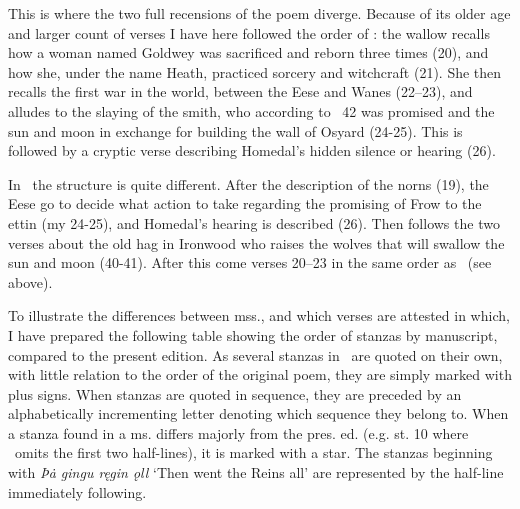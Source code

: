 This is where the two full recensions of the poem diverge. Because of its older age and larger count of verses I have here followed the order of \Regius: the wallow recalls how a woman named Goldwey was sacrificed and reborn three times (20), and how she, under the name Heath, practiced sorcery and witchcraft (21). She then recalls the first war in the world, between the Eese and Wanes (22–23), and alludes to the slaying of the smith, who according to \Gylfaginning\ 42 was promised  and the sun and moon in exchange for building the wall of Osyard (24-25). This is followed by a cryptic verse describing Homedal’s hidden silence or hearing (26).

In \Hauksbok\ the structure is quite different. After the description of the norns (19), the Eese go to decide what action to take regarding the promising of Frow to the ettin (my 24-25), and Homedal’s hearing is described (26). Then follows the two verses about the old hag in Ironwood who raises the wolves that will swallow the sun and moon (40-41). After this come verses 20–23 in the same order as \Regius\ (see above).

To illustrate the differences between mss., and which verses are attested in which, I have prepared the following table showing the order of stanzas by manuscript, compared to the present edition.  As several stanzas in \GylfMS\ are quoted on their own, with little relation to the order of the original poem, they are simply marked with plus signs.  When stanzas are quoted in sequence, they are preceded by an alphabetically incrementing letter denoting which sequence they belong to.  When a stanza found in a ms. differs majorly from the pres. ed. (e.g. st. 10 where \GylfMS\ omits the first two half-lines), it is marked with a star.  The stanzas beginning with \emph{Þȧ gingu ręgin ǫll} ‘Then went the Reins all’ are represented by the half-line immediately following.

